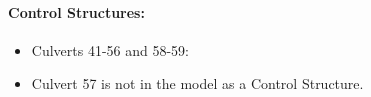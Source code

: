 \paragraph{Control Structures:}

\begin{itemize}

\item Culverts 41-56 and 58-59:


\item Culvert 57 is not in the model as a Control Structure.

\end{itemize}

